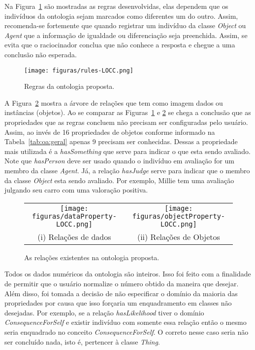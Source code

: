 Na Figura~\ref{fig:rlocc} são mostradas as regras desenvolvidas, elas dependem
que os indivíduos da ontologia sejam marcados como diferentes um do outro.
Assim, recomenda-se fortemente que quando registrar um indivíduo da classe
\emph{Object} ou \emph{Agent} que a informação de igualdade ou diferenciação
seja preenchida\dev{}. Assim, se evita que o raciocinador conclua que não
conhece a resposta e chegue a uma conclusão não esperada.

\begin{figure}[t]
  \centering
  \texttt{[image: figuras/rules-LOCC.png]}
  \caption{Regras da ontologia proposta.}
  \label{fig:rlocc}
\end{figure}

A Figura~\ref{fig:kplocc} mostra a árvore de relações que tem como imagem
dados ou instâncias (objetos). Ao se comparar as Figuras~\ref{fig:rlocc}
e \ref{fig:kplocc} se chega a conclusão que as propriedades que as
regras concluem não precisam ser configuradas pelo usuário. Assim, ao invés de
16 propriedades de objetos conforme informado na Tabela~\ref{tab:oa:geral}
apenas 9 precisam ser conhecidas. Dessas a propriedade mais utilizada é a
\emph{hasSomething} que serve para indicar o que esta sendo avaliado. Note que
\emph{hasPerson} deve ser usado quando o indivíduo em avaliação for um membro
da classe \emph{Agent}. Já, a relação \emph{hasJudge} serve para indicar que o
membro da classe \emph{Object} esta sendo avaliado. Por exemplo, Millie tem
uma avaliação julgando seu carro com uma valoração positiva.

\begin{figure}[b]
  \centering
  \begin{tabular}{cc}
  \texttt{[image: figuras/dataProperty-LOCC.png]} & \texttt{[image: figuras/objectProperty-LOCC.png]} \\
  (i) Relações de dados & (ii) Relações de Objetos
  \end{tabular}
  \caption{As relações existentes na ontologia proposta.}
  \label{fig:kplocc}
\end{figure}

Todos os dados numéricos da ontologia são inteiros. Isso foi feito com a
finalidade de permitir que o usuário normalize\dev{} o número obtido da
maneira que desejar. Além disso, foi tomada a decisão de não especificar o
domínio da maioria das propriedades por causa que isso forçaria um
enquadramento em classes não desejadas. Por exemplo, se a relação
\emph{hasLikelihood} tiver o domínio \emph{ConsequenceForSelf} e existir
indivíduo com somente essa relação então o mesmo seria enquadrado no conceito
\emph{ConsequenceForSelf}. O correto nesse caso seria não ser concluído nada,
isto é, pertencer à classe \emph{Thing}.

